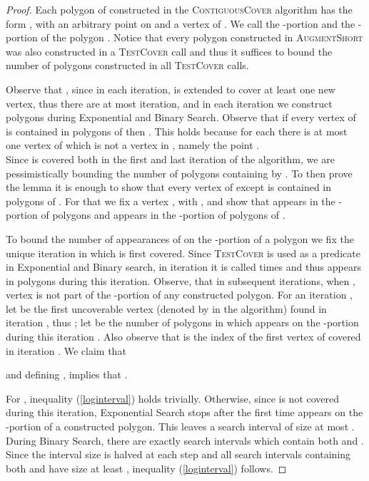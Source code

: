 \documentclass{llncs}
\begin{document}
\begin{proof}
Each polygon of  constructed in the \textsc{ContiguousCover} algorithm has the form , with  an arbitrary point on  and  a vertex of . We call  the -portion and  the -portion of the polygon .  Notice that  every polygon constructed in \textsc{AugmentShort} was also constructed in a \textsc{TestCover} call and thus it suffices to bound the number of polygons constructed in all \textsc{TestCover} calls.

Observe that , since in each iteration,  is extended to cover at least one new vertex, thus there are at most  iteration, and in each iteration we construct  polygons during Exponential and Binary Search.
Observe that if every vertex of  is contained in  polygons of  then . This holds because for each  there is at most one vertex of  which is not a vertex in , namely the point . \\ Since  is covered both in the first and last iteration of the algorithm, we are pessimistically bounding the number of polygons containing  by . To then prove the lemma it is enough to show that every vertex of  except  is contained in  polygons of . For that we fix a vertex , with , and show that  appears in the -portion of  polygons and  appears in the -portion of  polygons of .  

To bound the number of appearances of  on the -portion of a polygon we fix the unique iteration  in which   is first covered.  Since \textsc{TestCover} is used as a predicate in Exponential and Binary search, in iteration  it is called  times and thus  appears in  polygons during this iteration. Observe, that in subsequent iterations, when , vertex  is not part of the -portion of any constructed polygon. For an iteration , let  be the first uncoverable vertex (denoted by  in the algorithm) found in iteration , thus  ; let  be the number of polygons in which  appears on the -portion during this iteration . Also observe that  is the index of the first  vertex of  covered in iteration .
We claim that 

and defining , implies that .

For , inequality (\ref{loginterval}) holds trivially. Otherwise, since  is not covered during this iteration, Exponential Search stops after the first time  appears on the -portion of a constructed polygon. This leaves a search interval of size at most . During Binary Search, there are exactly  search intervals which contain both  and . Since the interval size is halved at each step and all search intervals containing both  and  have size at least ,  inequality (\ref{loginterval}) follows.


\end{proof}
\end{document}
